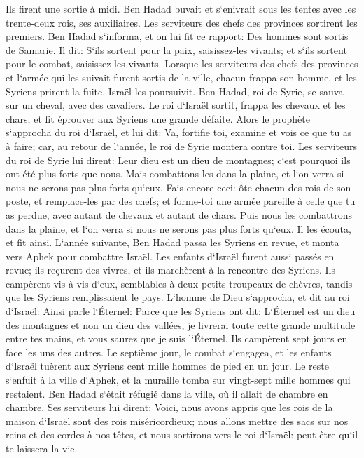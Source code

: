 \verse Ils firent une sortie à midi. Ben Hadad buvait et s`enivrait sous les tentes avec les trente-deux rois, ses auxiliaires. 
\verse Les serviteurs des chefs des provinces sortirent les premiers. Ben Hadad s`informa, et on lui fit ce rapport: Des hommes sont sortis de Samarie. 
\verse Il dit: S`ils sortent pour la paix, saisissez-les vivants; et s`ils sortent pour le combat, saisissez-les vivants. 
\verse Lorsque les serviteurs des chefs des provinces et l`armée qui les suivait furent sortis de la ville, 
\verse chacun frappa son homme, et les Syriens prirent la fuite. Israël les poursuivit. Ben Hadad, roi de Syrie, se sauva sur un cheval, avec des cavaliers. 
\verse Le roi d`Israël sortit, frappa les chevaux et les chars, et fit éprouver aux Syriens une grande défaite. 
\verse Alors le prophète s`approcha du roi d`Israël, et lui dit: Va, fortifie toi, examine et vois ce que tu as à faire; car, au retour de l`année, le roi de Syrie montera contre toi. 
\verse Les serviteurs du roi de Syrie lui dirent: Leur dieu est un dieu de montagnes; c`est pourquoi ils ont été plus forts que nous. Mais combattons-les dans la plaine, et l`on verra si nous ne serons pas plus forts qu`eux. 
\verse Fais encore ceci: ôte chacun des rois de son poste, et remplace-les par des chefs; 
\verse et forme-toi une armée pareille à celle que tu as perdue, avec autant de chevaux et autant de chars. Puis nous les combattrons dans la plaine, et l`on verra si nous ne serons pas plus forts qu`eux. Il les écouta, et fit ainsi. 
\verse L`année suivante, Ben Hadad passa les Syriens en revue, et monta vers Aphek pour combattre Israël. 
\verse Les enfants d`Israël furent aussi passés en revue; ils reçurent des vivres, et ils marchèrent à la rencontre des Syriens. Ils campèrent vis-à-vis d`eux, semblables à deux petits troupeaux de chèvres, tandis que les Syriens remplissaient le pays. 
\verse L`homme de Dieu s`approcha, et dit au roi d`Israël: Ainsi parle l`Éternel: Parce que les Syriens ont dit: L`Éternel est un dieu des montagnes et non un dieu des vallées, je livrerai toute cette grande multitude entre tes mains, et vous saurez que je suis l`Éternel. 
\verse Ils campèrent sept jours en face les uns des autres. Le septième jour, le combat s`engagea, et les enfants d`Israël tuèrent aux Syriens cent mille hommes de pied en un jour. 
\verse Le reste s`enfuit à la ville d`Aphek, et la muraille tomba sur vingt-sept mille hommes qui restaient. Ben Hadad s`était réfugié dans la ville, où il allait de chambre en chambre. 
\verse Ses serviteurs lui dirent: Voici, nous avons appris que les rois de la maison d`Israël sont des rois miséricordieux; nous allons mettre des sacs sur nos reins et des cordes à nos têtes, et nous sortirons vers le roi d`Israël: peut-être qu`il te laissera la vie. 
